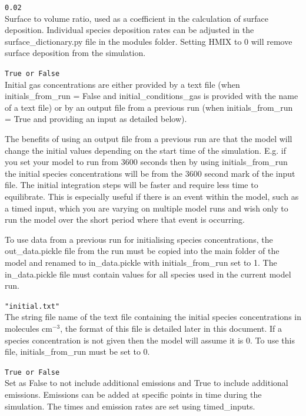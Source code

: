 \documentclass[a4paper]{refart}
\begin{document}
\texttt{0.02}\\
Surface to volume ratio, used as a coefficient in the calculation of surface deposition. Individual species deposition rates can be adjusted in the surface\_dictionary.py  file in the modules folder. Setting HMIX to 0 will remove surface deposition from the simulation.

\label{initials_from_run}
\texttt{True or False}\\
Initial gas concentrations are either provided by a text file (when initials\_from\_run = False and initial\_conditions\_gas is provided with the name of a text file) or by an output file from a previous run (when initials\_from\_run = True and providing an input as detailed below).

The benefits of using an output file from a previous run are that the model will change the initial values depending on the start time of the simulation. E.g. if you set your model to run from 3600 seconds then by using initials\_from\_run the initial species concentrations will be from the 3600 second mark of the input file. The initial integration steps will be faster and require less time to equilibrate. This is especially useful if there is an event within the model, such as a timed input, which you are varying on multiple model runs and wish only to run the model over the short period where that event is occurring.

To use data from a previous run for initialising species concentrations, the out\_data.pickle file from the run must be copied into the main folder of the model and renamed to in\_data.pickle with initials\_from\_run set to 1. The in\_data.pickle file must contain values for all species used in the current model run.

\texttt{"initial.txt"}\\
The string file name of the text file containing the initial species concentrations in molecules cm$^{-3}$, the format of this file is detailed later in this document. If a species concentration is not given then the model will assume it is 0. To use this file, initials\_from\_run must be set to 0.

\label{timed emissions}
\texttt{True or False}\\
Set as False to not include additional emissions and True to include additional emissions. Emissions can be added at specific points in time during the simulation. The times and emission rates are set using timed\_inputs.
\end{document}
